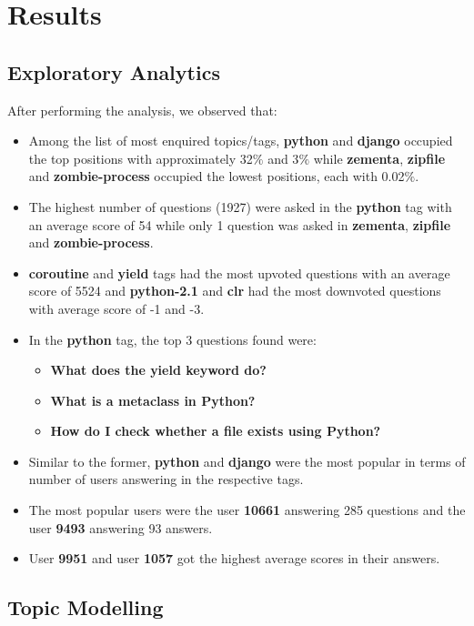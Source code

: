 \documentclass[journal]{IEEEtran}
\begin{document}
\section{Results}
\subsection{Exploratory Analytics}
After performing the analysis, we observed that:
\begin{itemize}
    \item Among the list of most enquired topics/tags, \textbf{python} and \textbf{django} occupied the top positions with approximately 32$\%$ and 3$\%$ while \textbf{zementa}, \textbf{zipfile} and \textbf{zombie-process} occupied the lowest positions, each with 0.02$\%$.
    \item The highest number of questions (1927) were asked in the \textbf{python} tag with an average score of 54 while only 1 question was asked in \textbf{zementa}, \textbf{zipfile} and \textbf{zombie-process}.
    \item \textbf{coroutine} and \textbf{yield} tags had the most upvoted questions with an average score of 5524 and \textbf{python-2.1} and \textbf{clr} had the most downvoted questions with average score of -1 and -3.
    \item In the \textbf{python} tag, the top 3 questions found were:
    \begin{itemize}
        \item \textbf{What does the \textbf{yield} keyword do?}
        \item \textbf{What is a metaclass in Python?}
        \item \textbf{How do I check whether a file exists using Python?}
    \end{itemize}
    \item Similar to the former, \textbf{python} and \textbf{django} were the most popular in terms of number of users answering in the respective tags.
    \item The most popular users were the user \textbf{10661} answering 285 questions and the user \textbf{9493} answering 93 answers.
    \item User \textbf{9951} and user \textbf{1057} got the highest average scores in their answers.
\end{itemize}
\subsection{Topic Modelling}
\end{document}
